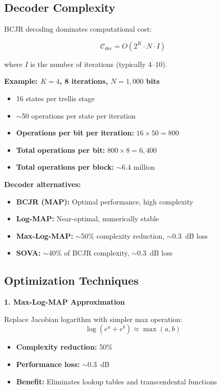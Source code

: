 \subsection{Decoder Complexity}

BCJR decoding dominates computational cost:

\begin{equation}
\mathcal{C}_{\text{dec}} = O(2^K \cdot N \cdot I)
\end{equation}

where $I$ is the number of iterations (typically 4--10).

\textbf{Example: $K=4$, 8 iterations, $N=1{,}000$ bits}
\begin{itemize}
\item 16 states per trellis stage
\item $\sim$50 operations per state per iteration
\item \textbf{Operations per bit per iteration:} $16 \times 50 = 800$
\item \textbf{Total operations per bit:} $800 \times 8 = 6{,}400$
\item \textbf{Total operations per block:} $\sim$6.4 million
\end{itemize}

\textbf{Decoder alternatives:}
\begin{itemize}
\item \textbf{BCJR (MAP):} Optimal performance, high complexity
\item \textbf{Log-MAP:} Near-optimal, numerically stable
\item \textbf{Max-Log-MAP:} $\sim$50\% complexity reduction, $\sim$0.3~dB loss
\item \textbf{SOVA:} $\sim$40\% of BCJR complexity, $\sim$0.3~dB loss
\end{itemize}

\subsection{Optimization Techniques}

\textbf{1. Max-Log-MAP Approximation}

Replace Jacobian logarithm with simpler max operation:
\begin{equation}
\log(e^a + e^b) \approx \max(a, b)
\end{equation}

\begin{itemize}
\item \textbf{Complexity reduction:} 50\%
\item \textbf{Performance loss:} $\sim$0.3~dB
\item \textbf{Benefit:} Eliminates lookup tables and transcendental functions
\end{itemize}

